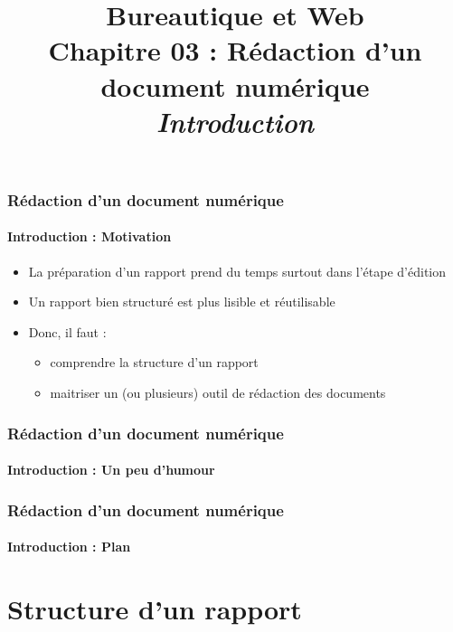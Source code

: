 \documentclass[xcolor=table]{beamer}
\title[BWEB : 03- Rédaction (Introduction)] %
{Bureautique et Web \\Chapitre 03 : Rédaction d'un document numérique\\ \slshape\small  Introduction}
\begin{document}
\begin{frame}
\frametitle{Rédaction d'un document numérique}
\framesubtitle{Introduction : Motivation}

\begin{itemize}
	\item La préparation d'un rapport prend du temps surtout dans l'étape d'édition 
	\item Un rapport bien structuré est plus lisible et réutilisable 
	\item Donc, il faut :
	\begin{itemize}
		\item comprendre la structure d'un rapport 
		\item maitriser un (ou plusieurs) outil de rédaction des documents
	\end{itemize}
\end{itemize}

\end{frame}

\begin{frame}
\frametitle{Rédaction d'un document numérique}
\framesubtitle{Introduction : Un peu d'humour}

\begin{center}
\end{center}

\end{frame}

\begin{frame}
\frametitle{Rédaction d'un document numérique}
\framesubtitle{Introduction : Plan}

\begin{multicols}{2}
	\tableofcontents
\end{multicols}
\end{frame}

\section{Structure d'un rapport}
\end{document}

